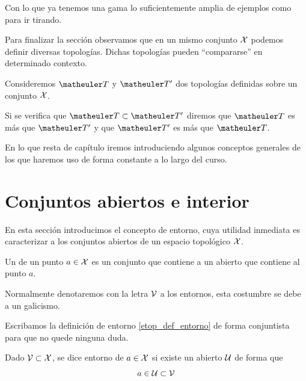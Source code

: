 \begin{exa}[Topologías]
\begin{enumerate}
		
	\end{enumerate}
	Con lo que ya tenemos una gama lo suficientemente amplia de ejemplos como para ir tirando.
\end{exa}
Para finalizar la sección observamos que en un mismo conjunto $\mathcal{X}$ podemos definir diversas topologías. Dichas topologías pueden ``compararse'' en determinado contexto.
\begin{defi}
	Consideremos $\T$ y $\T'$ dos topologías definidas sobre un conjunto $\mathcal{X}$.
	
	Si se verifica que $\T \subset \T'$ diremos que $\T$ es más  que $\T'$ y que $\T'$ es más  que $\T$.
\end{defi}
En lo que resta de capítulo iremos introduciendo algunos conceptos generales de los que haremos uso de forma constante a lo largo del curso.
\section{Conjuntos abiertos e interior}
\label{etop_entornos}
En esta sección introducimos el concepto de entorno, cuya utilidad inmediata es caracterizar a los conjuntos abiertos de un espacio topológico $\mathcal{X}$.
\begin{defi}
	\label{etop_def_entorno}
	Un  de un punto $a\in\mathcal{X}$ es un conjunto que contiene a un abierto que contiene al punto $a$.
\end{defi}
Normalmente denotaremos con la letra $\mathcal{V}$ a los entornos, esta costumbre se debe a un galicismo. %

Escribamos la definición de entorno \ref{etop_def_entorno} de forma conjuntista para que no quede ninguna duda.

Dado $\mathcal{V}\subset \mathcal{X}$, se dice entorno de $a\in \mathcal{X}$ si existe un abierto $\mathcal{U}$ de forma que
\begin{equation}
\label{etop_eq_entorno}
a\in\mathcal{U}\subset\mathcal{V}
\end{equation}

